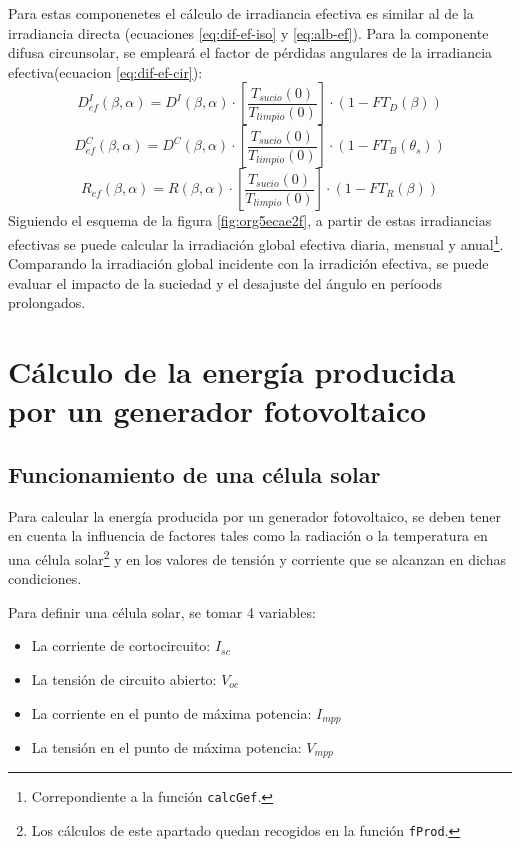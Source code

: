 Para estas componenetes el cálculo de irradiancia efectiva es similar al de la irradiancia directa (ecuaciones \ref{eq:dif-ef-iso} y \ref{eq:alb-ef}). Para la componente difusa circunsolar, se empleará el factor de pérdidas angulares de la irradiancia efectiva(ecuacion \ref{eq:dif-ef-cir}):
\begin{equation}
D_{ef}^I(\beta ,\alpha)=D^I(\beta ,\alpha)\cdot[\frac{T_{sucio}(0)}{T_{limpio}(0)}]\cdot (1-FT_D(\beta))
\label{eq:dif-ef-iso}
\end{equation}
\begin{equation}
D_{ef}^C(\beta ,\alpha)=D^C(\beta ,\alpha)\cdot[\frac{T_{sucio}(0)}{T_{limpio}(0)}]\cdot (1-FT_B(\theta_s))
\label{eq:dif-ef-cir}
\end{equation}
\begin{equation}
R_{ef}(\beta ,\alpha)=R(\beta ,\alpha)\cdot[\frac{T_{sucio}(0)}{T_{limpio}(0)}]\cdot (1-FT_R(\beta))
\label{eq:alb-ef}
\end{equation}
Siguiendo el esquema de la figura \ref{fig:org5ecae2f}, a partir de estas irradiancias efectivas se puede calcular la irradiación global efectiva diaria, mensual y anual\footnote{Correpondiente a la función \texttt{calcGef}.}. Comparando la irradiación global incidente con la irradición efectiva, se puede evaluar el impacto de la suciedad y el desajuste del ángulo en períoods prolongados.

\section{Cálculo de la energía producida por un generador fotovoltaico}
\label{sec:org6935e62}
\label{sec:calculo-energia-producida-generador}

\subsection{Funcionamiento de una célula solar}
\label{sec:org9b823b2}
\label{subsec:funcionamiento-celula-solar}
Para calcular la energía producida por un generador fotovoltaico, se deben tener en cuenta la influencia de factores tales como la radiación o la temperatura en una célula solar\footnote{Los cálculos de este apartado quedan recogidos en la función \texttt{fProd}.} y en los valores de tensión y corriente que se alcanzan en dichas condiciones.

Para definir una célula solar, se tomar 4 variables:
\begin{itemize}
\item La corriente de cortocircuito: \(I_{sc}\)
\item La tensión de circuito abierto: \(V_{oc}\)
\item La corriente en el punto de máxima potencia: \(I_{mpp}\)
\item La tensión en el punto de máxima potencia: \(V_{mpp}\)
\end{itemize}

